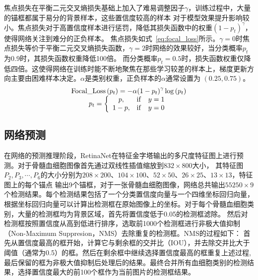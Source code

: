 焦点损失在平衡二元交叉熵损失基础上加入了难易调整因子$\gamma$，训练过程中，大量的锚框都属于易分的背景样本，这些置信度较高的样本
对于模型效果提升影响较小。焦点损失对于高置信度样本进行惩罚，降低其损失函数中的权重$(1-p_t)^{\gamma}$，使得网络关注到难分的正负样本。
焦点损失如式~\ref{eq:focal_loss}所示。$\gamma=0$时焦点损失等价于平衡二元交叉熵损失函数，$\gamma=2$时网络的效果较好，当分类概率$p_t$为0.9时，其损失函数权重降低100倍。
而分类概率$p_t = 0.5$时，损失函数权重仅降低四倍。这使得网络在训练时能不断地聚焦在那些学习较差的样本上，梯度更新方向主要由困难样本决定。$\alpha$是类别权重，正负样本的$\alpha$通常设置为
$(0.25, 0.75)$。
\begin{equation}               
  \begin{array}{*{20}{c}} {{\rm{Focal\_Loss}}\left( {{p_t}} \right) =  - \alpha {{\left( {1 - {p_t}} \right)}^\gamma }\log \left( {{p_t}} \right)}\\ 
    {{p_t} = \left\{ {\begin{array}{*{20}{c}} {p,}&{{\rm{ if }}}&{y = 1}\\ {1 - p,}&{{\rm{ if }}}&{y = 0} \end{array}} \right.} \end{array}    
  \label{eq:focal_loss}     
\end{equation} 

\subsection{网络预测}

在网络的预测推理阶段，RetinaNet在特征金字塔输出的多尺度特征图上进行预测。对于骨髓血细胞图像首先通过双线性插值缩放到$832 \times 800$大小，
其特征图$P_2, P_3, \cdots, P_6$的大小分别为$208 \times 200$、$104 \times 100$、$52 \times 50$、$ 26 \times 25$、$13 \times 13$，特征图上的每个锚点
输出9个锚框，对于一张骨髓血细胞图像，网络总共输出$55250 \times 9$个检测结果。每个检测结果包括了一个分类置信度向量与一个四维坐标回归向量，
根据坐标回归向量可以计算出检测框在原始图像上的坐标。对于每个骨髓血细胞类别，大量的检测框均为背景区域，首先将置信度低于0.05的检测框滤除。
然后对检测框按照置信度从高到低进行排序，选取前1000个检测框进行非极大值抑制（Non-Maximum Suppresion，NMS）\cite{neubeck2006efficient}去除重复的检测框。NMS的过程如下：
首先从置信度最高的框开始，计算它与剩余框的交并比（IOU），并去除交并比大于阈值（通常为0.5）的框。然后在剩余框中继续选择置信度最高的框重复上述过程,
最后保留的框为非极大值抑制后处理后的结果。最终合并所有血细胞类别的检测结果，选择置信度最大的前100个框作为当前图片的检测框结果。


